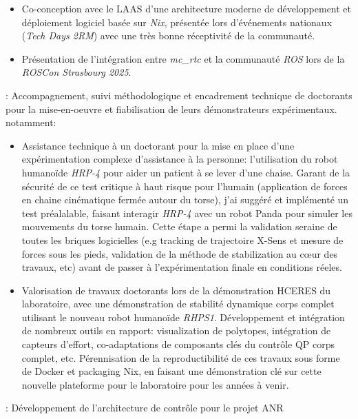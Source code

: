 \begin{cventries}
{\begin{cvitems}
\begin{itemize}
        \item Co-conception avec le LAAS d'une architecture moderne de développement et déploiement logiciel
          basée sur \emph{Nix}, présentée lors d'événements nationaux (\emph{Tech Days 2RM}) avec une très
          bonne réceptivité de la communauté.
        \item Présentation de l'intégration entre \emph{mc\_rtc} et la communauté \emph{ROS} lors de la
          \emph{ROSCon Strasbourg 2025}.
      \end{itemize}
    \item {} : Accompagnement, suivi méthodologique et encadrement
      technique de doctorants pour la mise-en-oeuvre et fiabilisation de leurs démonstrateurs expérimentaux. notamment:
      \begin{itemize}
        \item Assistance technique à un doctorant pour la mise en place d'une expérimentation complexe
          d'assistance à la personne: l'utilisation du robot humanoïde \emph{HRP-4} pour aider un patient à
          se lever d'une chaise. Garant de la sécurité de ce test critique à haut risque pour l'humain
          (application de forces en chaine cinématique fermée autour du torse), j'ai suggéré et implémenté un
          test préalalable, faisant interagir \emph{HRP-4} avec un robot Panda pour simuler les mouvements du
          torse humain. Cette étape a permi la validation seraine de toutes les briques logicielles (e.g
            tracking de trajectoire X-Sens et mesure de forces sous les pieds, validation de la méthode de
          stabilization au cœur des travaux, etc) avant de passer à l'expérimentation finale en conditions réeles.
        \item Valorisation de travaux doctorants lors de la démonstration HCERES du laboratoire, avec une
          démonstration de stabilité dynamique corps complet utilisant le nouveau robot humanoïde
          \emph{RHPS1}. Développement et intégration de nombreux outils en rapport: visualization de
          polytopes, intégration de capteurs d'effort, co-adaptations de composants clés du contrôle QP corps
          complet, etc. Pérennisation de la reproductibilité de ces travaux sous forme de Docker et packaging
          Nix, en faisant une démonstration clé sur cette nouvelle plateforme pour le laboratoire pour les
          années à venir.
      \end{itemize}
    \item {}: Développement de l'architecture de contrôle pour le projet ANR

\end{cvitems}}
\end{cventries}
